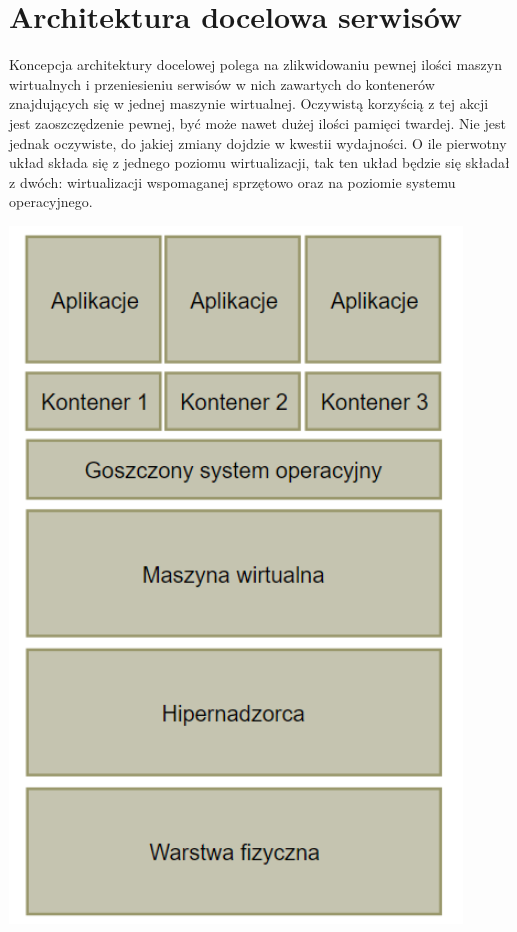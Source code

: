 \documentclass[polish, a4paper, 12pt, oneside]{book}
\begin{document}
	\section{Architektura docelowa serwisów}
	Koncepcja architektury docelowej polega na zlikwidowaniu pewnej ilości maszyn wirtualnych i przeniesieniu serwisów w nich zawartych do kontenerów znajdujących się w jednej maszynie wirtualnej. Oczywistą korzyścią z tej akcji jest zaoszczędzenie pewnej, być może nawet dużej ilości  pamięci twardej. Nie jest jednak oczywiste, do jakiej zmiany dojdzie w kwestii wydajności. O ile pierwotny układ składa się z jednego poziomu wirtualizacji, tak ten układ będzie się składał z dwóch: wirtualizacji wspomaganej sprzętowo oraz na poziomie systemu operacyjnego.
	\begin{center}
		\includegraphics[width=120mm]{schemat_archdoc.png}
	\end{center}
	
\end{document}
